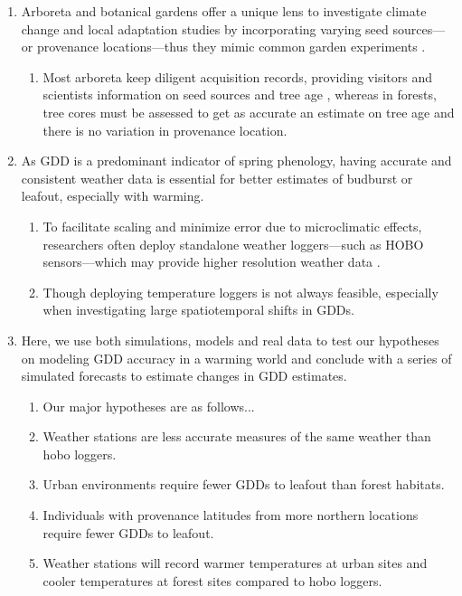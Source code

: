 \documentclass{article}\usepackage[]{graphicx}\usepackage[]{color}
\begin{document}
\begin{enumerate}
\item Arboreta and botanical gardens offer a unique lens to investigate climate change and local adaptation studies by incorporating varying seed sources---or provenance locations---thus they mimic common garden experiments \citep{Primack2009}. 
  \begin{enumerate}
  \item Most arboreta keep diligent acquisition records, providing visitors and scientists information on seed sources and tree age \citep{Dosmann2006}, whereas in forests, tree cores must be assessed to get as accurate an estimate on tree age and there is no variation in provenance location.
  \end{enumerate}
  
\item As GDD is a predominant indicator of spring phenology, having accurate and consistent weather data is essential for better estimates of budburst or leafout, especially with warming.
  \begin{enumerate}
  \item To facilitate scaling and minimize error due to microclimatic effects, researchers often deploy standalone weather loggers---such as HOBO sensors---which may provide higher resolution weather data \citep{Schwartz2013a,Whiteman2000}.
  \item Though deploying temperature loggers is not always feasible, especially when investigating large spatiotemporal shifts in GDDs. 
  \end{enumerate}
  
\item Here, we use both simulations, models and real data to test our hypotheses on modeling GDD accuracy in a warming world and conclude with a series of simulated forecasts to estimate changes in GDD estimates.
  \begin{enumerate}
  \item Our major hypotheses are as follows...
  \item Weather stations are less accurate measures of the same weather than hobo loggers.
  \item Urban environments require fewer GDDs to leafout than forest habitats.
  \item Individuals with provenance latitudes from more northern locations require fewer GDDs to leafout. 
  \item Weather stations will record warmer temperatures at urban sites and cooler temperatures at forest sites compared to hobo loggers. 
  \end{enumerate}
\end{enumerate}
  
\end{document}
